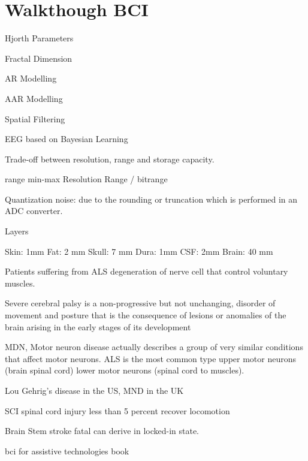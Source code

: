 \chapter{Walkthough BCI}

Hjorth Parameters

Fractal Dimension

AR Modelling

AAR Modelling

Spatial Filtering

EEG based on Bayesian Learning


Trade-off between resolution, range and storage capacity.

range min-max
Resolution Range / bitrange

Quantization noise: due to the rounding or truncation which is performed in an ADC converter.

Layers

Skin: 1mm
Fat: 2 mm
Skull: 7 mm
Dura: 1mm
CSF: 2mm
Brain: 40 mm


Patients suffering from ALS degeneration of nerve cell that control voluntary muscles.  

Severe cerebral palsy is a non-progressive but not unchanging, disorder of movement and posture that is the consequence of lesions or anomalies of the brain arising in the early stages of its development

MDN, Motor neuron disease actually describes a group of very similar conditions that affect motor neurons.  ALS is the most common type upper motor neurons (brain spinal cord) lower motor neurons (spinal cord to muscles).

Lou Gehrig's disease in the US, MND in the UK

SCI spinal cord injury less than 5 percent recover locomotion

Brain Stem stroke fatal can derive in locked-in state.

bci for assistive technologies book


